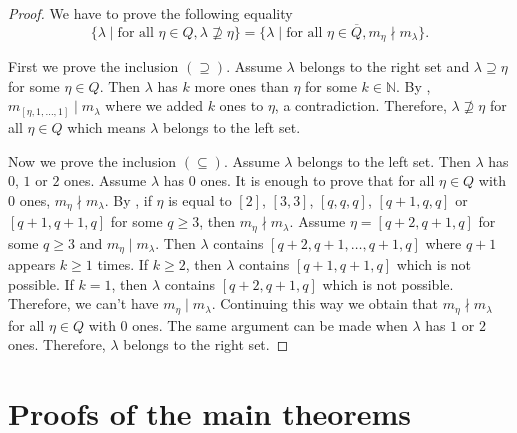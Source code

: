 \documentclass[12pt, reqno]{amsart}
\theoremstyle{remark}
\begin{document}
\begin{proof}
  We have to prove the following equality
  \begin{equation*}
    \{\lambda \mid \text{for all }\eta \in Q, \lambda \nsupseteq \eta\} = \{\lambda \mid \text{for all } \eta \in \overline{Q}, m_\eta \nmid m_\lambda\}.
  \end{equation*}
  
  First we prove the inclusion $(\supseteq)$.
  Assume $\lambda$ belongs to the right set and $\lambda \supseteq \eta$ for some $\eta \in Q$.
  Then $\lambda$ has $k$ more ones than $\eta$ for some $k \in \mathbb{N}$.
  By , $m_{[\eta, 1, \dots, 1]} \mid m_\lambda$ where we added $k$ ones to $\eta$, a contradiction.
  Therefore, $\lambda \nsupseteq \eta$ for all $\eta \in Q$ which means $\lambda$ belongs to the left set.

  Now we prove the inclusion $(\subseteq)$.
  Assume $\lambda$ belongs to the left set.
  Then $\lambda$ has $0$, $1$ or $2$ ones.
  Assume $\lambda$ has $0$ ones.
  It is enough to prove that for all $\eta \in Q$ with $0$ ones, $m_\eta \nmid m_\lambda$.
  By , if $\eta$ is equal to $[2]$, $[3, 3]$, $[q, q, q]$, $[q + 1, q, q]$ or $[q + 1, q + 1, q]$ for some $q \ge 3$, then $m_\eta \nmid m_\lambda$.
  Assume $\eta = [q + 2, q + 1, q]$ for some $q \ge 3$ and $m_\eta \mid m_\lambda$.
  Then $\lambda$ contains $[q + 2, q + 1, \dots, q + 1, q]$ where $q + 1$ appears $k \ge 1$ times.
  If $k \ge 2$, then $\lambda$ contains $[q + 1, q + 1, q]$ which is not possible.
  If $k = 1$, then $\lambda$ contains $[q + 2, q + 1, q]$ which is not possible.
  Therefore, we can't have $m_\eta \mid m_\lambda$.
  Continuing this way we obtain that $m_\eta \nmid m_\lambda$ for all $\eta \in Q$ with $0$ ones.
  The same argument can be made when $\lambda$ has $1$ or $2$ ones.
  Therefore, $\lambda$ belongs to the right set.
\end{proof}

\section{Proofs of the main theorems}
\label{sec:proofs-main-theorems}
\end{document}
